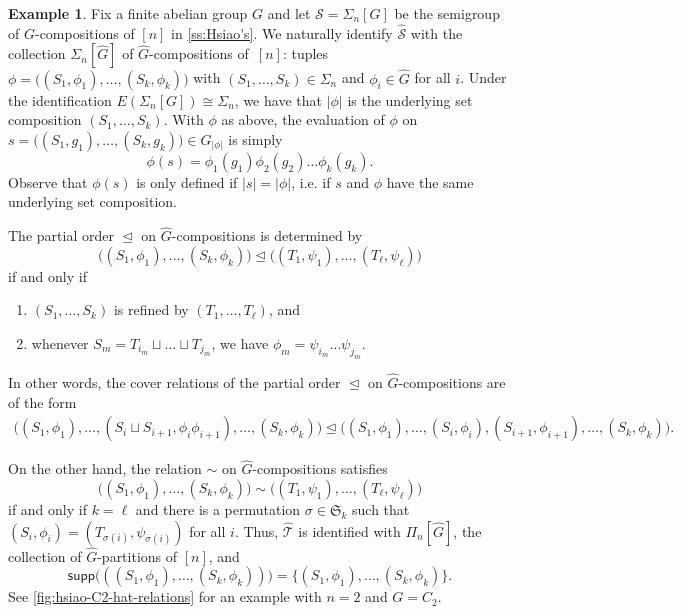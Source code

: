 \documentclass[11pt, oneside, reqno]{amsart}
\theoremstyle{definition}
\newtheorem{example}[theorem]{Example}
\numberwithin{equation}{section}
\def \SS{{\mathcal{S}}}
\def \TT{{\mathcal{T}}}
\def \wh{\widehat}
\def \ztwo {{C_2}}
\def \gsetcomposition{{\Sigma_n[G]}}
\def \hsiao {{\gsetcomposition}}
\DeclareMathOperator{\chleq}{\unlhd}
\def \supp{\mathsf{supp}}
\def \sgn{\mathbf{sgn}}
\def \trv{\mathbf{trv}}
\newcommand{\abs}[1]{|{#1}|} 				%
\begin{document}
\begin{example}
    Fix a finite abelian group $G$ and let $\SS = \hsiao$ be the semigroup of $G$-compositions of $[n]$ in \cref{ss:Hsiao's}.
    We naturally identify $\wh{\SS}$ with the collection $\Sigma_n[\wh{G}]$ of $\wh{G}$-compositions of~$[n]$:
    tuples $\phi = \big( (S_1,\phi_1),\dots,(S_k,\phi_k) \big)$ with $(S_1,\dots,S_k) \in \Sigma_n$ and $\phi_i \in \wh{G}$ for all $i$.
    Under the identification $E(\hsiao) \cong \Sigma_n$, we have that $\abs{\phi}$ is the underlying set composition $(S_1,\dots,S_k)$.
    With $\phi$ as above, the evaluation of $\phi$ on $s = \big( (S_1,g_1),\dots,(S_k,g_k) \big) \in G_{\abs{\phi}}$ is simply
    \[
        \phi(s) = \phi_1(g_1) \phi_2(g_2) \dots \phi_k(g_k).
    \]
    Observe that $\phi(s)$ is only defined if $\abs{s} = \abs{\phi}$, i.e. if $s$ and $\phi$ have the same underlying set composition.

    The partial order $\chleq$ on $\wh{G}$-compositions is determined by
    \[
        \big( (S_1,\phi_1),\dots,(S_k,\phi_k) \big) \chleq \big( (T_1,\psi_1),\dots,(T_\ell,\psi_\ell) \big)
    \]
    if and only if
    \begin{enumerate}
        \item
            $(S_1,\dots,S_k)$ is refined by $(T_1,\dots,T_\ell)$, and
        \item
            whenever $S_m = T_{i_m} \sqcup \dots  \sqcup T_{j_m}$, we have $\phi_m = \psi_{i_m}  \dots \psi_{j_m}$.
    \end{enumerate}
    In other words, the cover relations of the partial order $\chleq$ on $\wh{G}$-compositions are of the form
    \begin{align*}
        \big( (S_1,\phi_1) , \dots, (S_i \sqcup S_{i+1} ,\phi_i\phi_{i+1}) ,\dots , (S_k,\phi_k) \big)
        \chleq 
        \big( (S_1,\phi_1) , \dots, (S_i ,\phi_i) , (S_{i+1} ,\phi_{i+1}) ,\dots , (S_k,\phi_k) \big).
    \end{align*}

    On the other hand, the relation $\sim$ on $\wh{G}$-compositions satisfies
    \[
        \big( (S_1,\phi_1),\dots,(S_k,\phi_k) \big) \sim \big( (T_1,\psi_1),\dots,(T_\ell,\psi_\ell) \big)
    \]
    if and only if $k = \ell$ and there is a permutation $\sigma \in \mathfrak{S}_k$ such that $(S_i , \phi_i) = (T_{\sigma(i)} , \psi_{\sigma(i)})$ for all $i$.
    Thus, $\wh{\TT}$ is identified with $\Pi_n[\wh{G}]$, the collection of $\wh{G}$-partitions of $[n]$, and
    \[
        \supp\big( ((S_1,\phi_1),\dots,(S_k,\phi_k)) \big) = \big\{ (S_1,\phi_1),\dots,(S_k,\phi_k) \big\}.
    \]
    See \cref{fig:hsiao-C2-hat-relations} for an example with $n=2$ and $G = \ztwo$.
    \begin{figure}[ht]
\end{figure}
\end{example}
\end{document}
